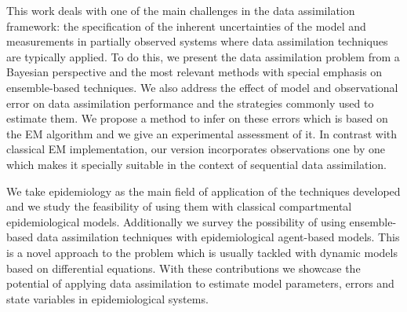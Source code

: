 \documentclass[
11pt, %
spanish, %
singlespacing, %
toctotoc, %
headsepline, %
]{MastersDoctoralThesis} %
\begin{document}
\begin{extraAbstract}

    This work deals with one of the main challenges in the data assimilation framework: the specification of the inherent uncertainties of the model  and measurements in partially observed systems where data assimilation techniques are typically applied. To do this, we present the data assimilation problem from a Bayesian perspective and the most relevant methods with special emphasis on ensemble-based techniques. We also address the effect of model and observational error on data assimilation performance and the strategies commonly used to estimate them. We propose a method to infer on these errors which is based on the EM algorithm and we give an experimental assessment of it. In contrast with classical EM implementation, our version incorporates observations one by one which makes it specially suitable in the context of sequential data assimilation.

    We take epidemiology as the main field of application of the techniques developed and we study the feasibility of using them with classical compartmental epidemiological models. Additionally we survey the possibility of using ensemble-based data assimilation techniques with epidemiological agent-based models. This is a novel approach to the problem which is usually tackled with dynamic models based on differential equations. With these contributions we showcase the potential of applying data assimilation to estimate model parameters, errors and state variables in epidemiological systems.

\end{extraAbstract}




\end{document}
